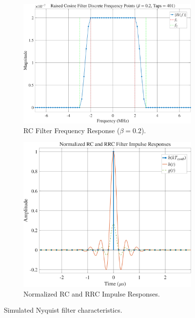 \documentclass[11pt]{article}
\begin{document}
	\begin{figure}[H]
		\centering
		\begin{subfigure}[b]{0.48\textwidth}
			\centering
			\includegraphics[width=\linewidth]{Images/h-rc-freq}
			\caption{RC Filter Frequency Response ($\beta = 0.2$).}
			\label{fig:h-rc-freq_compact}
		\end{subfigure}
		\hfill
		\begin{subfigure}[b]{0.48\textwidth}
			\centering
			\includegraphics[width=\linewidth]{Images/h-rc}
			\caption{Normalized RC and RRC Impulse Responses.}
			\label{fig:h-rc_compact}
		\end{subfigure}
		\caption{Simulated Nyquist filter characteristics.}
		\label{fig:nyquist-filter-combined}
	\end{figure}
	
\end{document}
